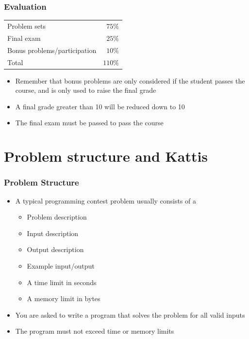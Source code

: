 \documentclass{beamer}
\begin{document}
\begin{frame}[plain]
	\frametitle{Evaluation}
	\begin{center}
        \begin{tabular}{lr}
            Problem sets & $75\%$ \\
            Final exam & $25\%$ \\
            Bonus problems/participation & $10\%$ \\
            \hline
            Total & $110\%$ \\
        \end{tabular}
	\end{center}
	
	\begin{itemize}
        \item Remember that bonus problems are only considered if the student passes the course, and is only used to raise the final grade
        \item A final grade greater than 10 will be reduced down to 10
        \item The final exam must be passed to pass the course
	\end{itemize}
\end{frame}


\section*{Problem structure and Kattis}

\begin{frame}[plain]
	\frametitle{Problem Structure}
	\begin{itemize}
		\item A typical programming contest problem usually consists of a
        \begin{itemize} 
            \item Problem description
            \item Input description
            \item Output description
            \item Example input/output
            \item A time limit in seconds
            \item A memory limit in bytes
        \end{itemize}
        \item You are asked to write a program that solves the problem for all valid inputs
        \item The program must not exceed time or memory limits
	\end{itemize}
\end{frame}
\end{document}
